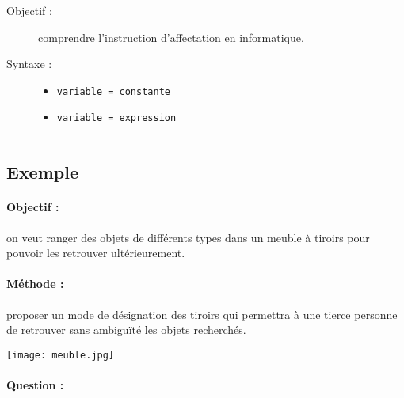 \noindent\begin{minipage}{7cm}
\begin{description}
\item[Objectif :] comprendre l'instruction d'af\-fec\-ta\-tion en informatique.
\item[Syntaxe \python :] \mbox{}
	\begin{itemize}
	\item \texttt{variable = constante}
	\item \texttt{variable = expression}
	\end{itemize}
\end{description}
\end{minipage}
\mbox{}\hfill
\begin{tabular}{c}
\end{tabular}

\subsection{Exemple}

\noindent\begin{minipage}{9cm}
\paragraph{Objectif :} 
on veut ranger des objets de différents types dans un meuble à tiroirs
pour pouvoir les retrouver ultérieurement.
\vspace*{2mm}

\paragraph{Méthode :} 
proposer un mode de désignation des tiroirs qui permettra à une tierce
personne de retrouver sans ambiguïté les objets recherchés.

\end{minipage}
\hfill
\begin{minipage}{5cm}
\texttt{[image: meuble.jpg]}
\end{minipage}



\paragraph{Question :} 

